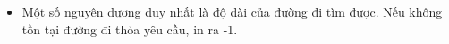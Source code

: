 \begin{itemize}
	\item     Một số nguyên dương duy nhất là độ dài của đường đi tìm được. Nếu không tồn tại đường đi thỏa yêu cầu, in ra -1.   
\end{itemize}